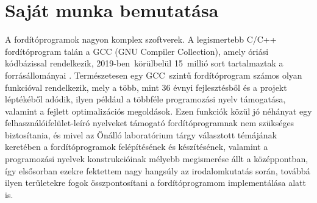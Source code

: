 
\chapter{Saját munka bemutatása}

A fordítóprogramok nagyon komplex szoftverek. A legismertebb C/C++ fordítóprogram talán a GCC (GNU Compiler Collection), amely óriási kódbázissal rendelkezik, 2019-ben~körülbelül 15~millió sort tartalmaztak a forrásállományai \cite{GccWiki}. Természetesen egy GCC~szintű fordítóprogram számos olyan funkcióval rendelkezik, mely a több, mint 36 évnyi fejlesztésből és a projekt léptékéből adódik, ilyen például a többféle programozási nyelv támogatása, valamint a fejlett optimalizációs megoldások. Ezen funkciók közül jó néhányat egy felhasználóifelület-leíró nyelveket támogató fordítóprogramnak nem szükséges biztosítania, és mivel az Önálló laboratórium tárgy választott témájának keretében a fordítóprogramok felépítésének és készítésének, valamint a programozási nyelvek konstrukcióinak mélyebb megismerése állt a középpontban, így elsősorban ezekre fektettem nagy hangsúly az irodalomkutatás során, továbbá ilyen területekre fogok összpontosítani a fordítóprogramom implementálása alatt is.




